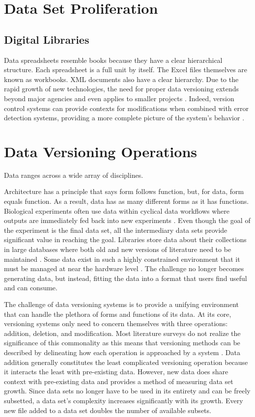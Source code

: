 \section{Data Set Proliferation}

\subsection{Digital Libraries}
Data spreadsheets resemble books because they have a clear hierarchical structure.
Each spreadsheet is a full unit by itself.  The Excel files themselves are known as workbooks.
XML documents also have a clear hierarchy.
Due to the rapid growth of new technologies, the need for proper data versioning extends beyond major agencies and even applies to smaller projects \cite{burrows2006review} \cite{Tagger2005} \cite{Stuckenholz:2005:CEV:1039174.1039197}.
Indeed, version control systems can provide contexts for modifications when combined with error detection systems, providing a more complete picture of the system's behavior \cite{Fischer2003}.

\section{Data Versioning Operations}
Data ranges across a wide array of disciplines.

Architecture has a principle that says form follows function, but, for data, form equals function.
As a result, data has as many different forms as it has functions.
Biological experiments often use data within cyclical data workflows where outputs are immediately fed back into new experiments \cite{Tagger2005}.
Even though the goal of the experiment is the final data set, all the intermediary data sets provide significant value in reaching the goal.
Libraries store data about their collections in large databases where both old and new versions of literature need to be maintained \cite{Wiil:2000:RDH:338407.338517}.
Some data exist in such a highly constrained environment that it must be managed at near the hardware level \cite{Flouris04clotho:transparent}.
The challenge no longer becomes generating data, but instead, fitting the data into a format that users find useful and can consume.

The challenge of data versioning systems is to provide a unifying environment that can handle the plethora of forms and functions of its data.
At its core, versioning systems only need to concern themselves with three operations: addition, deletion, and modification.
Most literature surveys do not realize the significance of this commonality as this means that versioning methods can be described by delineating how each operation is approached by a system \cite{Tagger2005} \cite{burrows2006review}.
Data addition generally constitutes the least complicated versioning operation because it interacts the least with pre-existing data.
However, new data does share context with pre-existing data and provides a method of measuring data set growth.
Since data sets no longer have to be used in its entirety and can be freely subsetted, a data set's complexity increases significantly with its growth.
Every new file added to a data set doubles the number of available subsets.

